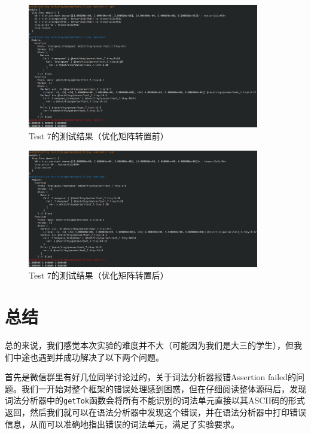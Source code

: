 \documentclass[lang=cn,11pt,a4paper]{elegantpaper}
\begin{document}
\begin{enumerate}
  \begin{figure}[H]
    \centering
    \includegraphics[width=0.9\textwidth]{./img/test7-unoptimized.png}
    \caption{Test 7的测试结果（优化矩阵转置前）}
    \label{fig3}
  \end{figure}

  \begin{figure}[H]
    \centering
    \includegraphics[width=0.9\textwidth]{./img/test7-optimized.png}
    \caption{Test 7的测试结果（优化矩阵转置后）}
    \label{fig4}
  \end{figure}

\end{enumerate}



\section{总结}


总的来说，我们感觉本次实验的难度并不大（可能因为我们是大三的学生），但我们中途也遇到并成功解决了以下两个问题。

首先是微信群里有好几位同学讨论过的，关于词法分析器报错Assertion failed的问题。我们一开始对整个框架的错误处理感到困惑，但在仔细阅读整体源码后，发现词法分析器中的\texttt{getTok}函数会将所有不能识别的词法单元直接以其ASCII码的形式返回，然后我们就可以在语法分析器中发现这个错误，并在语法分析器中打印错误信息，从而可以准确地指出错误的词法单元，满足了实验要求。
\end{document}
